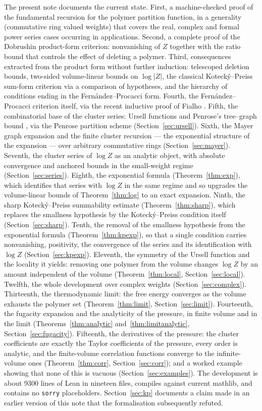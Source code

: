 \documentclass[11pt]{amsart}
\begin{document}
The present note documents the current state. First, a machine-checked
proof of the fundamental recursion for the polymer partition function, in a
generality (commutative ring valued weights) that covers the real, complex
and formal power series cases occurring in applications. Second, a complete
proof of the Dobrushin product-form criterion: nonvanishing of $Z$ together
with the ratio bound that controls the effect of deleting a polymer. Third,
consequences extracted from the product form without further induction:
telescoped deletion bounds, two-sided volume-linear bounds on
$\log \lvert Z \rvert$, the classical Kotecký--Preiss sum-form criterion
via a comparison of hypotheses, and the hierarchy of conditions ending in
the Fernández--Procacci form. Fourth, the Fernández--Procacci criterion
itself, via the recent inductive proof of Fialho \cite{Fia20}. Fifth, the
combinatorial base of the cluster series: Ursell functions and Penrose's
tree--graph bound \cite{Pen67}, via the Penrose partition scheme
(Section~\ref{sec:ursell}). Sixth, the Mayer graph expansion \cite{MM41}
and the finite cluster recursion — the exponential structure of the
expansion — over arbitrary commutative rings
(Section~\ref{sec:mayer}). Seventh, the cluster series of $\log Z$ as an
analytic object, with absolute convergence and anchored bounds in the
small-weight regime (Section~\ref{sec:series}). Eighth, the exponential
formula (Theorem~\ref{thm:exp}), which identifies that series with
$\log Z$ in the same regime and so upgrades the volume-linear bounds of
Theorem~\ref{thm:log} to an exact expansion. Ninth, the sharp
Kotecký--Preiss summability estimate (Theorem~\ref{thm:sharp}), which
replaces the smallness hypothesis by the Kotecký--Preiss condition
itself (Section~\ref{sec:sharp}). Tenth, the removal of the smallness
hypothesis from the exponential formula (Theorem~\ref{thm:kpexp}), so
that a single condition carries nonvanishing, positivity, the
convergence of the series and its identification with $\log Z$
(Section~\ref{sec:kpexp}). Eleventh, the symmetry of the Ursell function
and the locality it yields: removing one polymer from the volume changes
$\log Z$ by an amount independent of the volume
(Theorem~\ref{thm:local}, Section~\ref{sec:local}). Twelfth, the whole
development over complex weights (Section~\ref{sec:complex}).
Thirteenth, the thermodynamic limit: the free energy converges as the
volume exhausts the polymer set (Theorem~\ref{thm:limit},
Section~\ref{sec:limit}). Fourteenth, the fugacity expansion and the
analyticity of the pressure, in finite volume and in the limit
(Theorems~\ref{thm:analytic} and~\ref{thm:limitanalytic},
Section~\ref{sec:fugacity}). Fifteenth, the derivatives of the pressure:
the cluster coefficients are exactly the Taylor coefficients of the
pressure, every order is analytic, and the finite-volume correlation
functions converge to the infinite-volume ones (Theorem~\ref{thm:corr},
Section~\ref{sec:corr});
and a worked example showing that none of this is vacuous
(Section~\ref{sec:examples}). The development is about 9300 lines of Lean
in nineteen files, compiles against current \textsf{mathlib}, and
contains no \texttt{sorry} placeholders.
Section~\ref{sec:kp} documents a claim made in an earlier version of this
note that the formalisation subsequently refuted.
\end{document}
